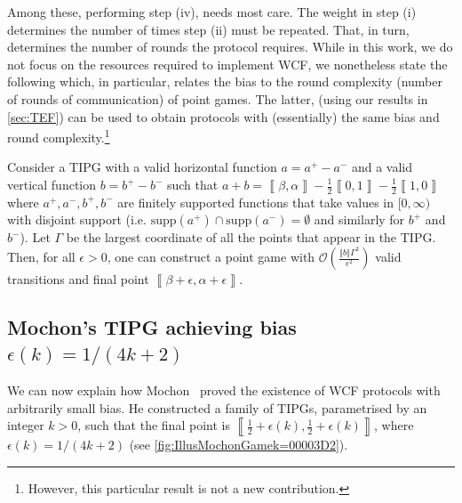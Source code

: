 \documentclass{theoretics}
\newcommand{\supp}{\text{supp}}
\begin{document}
Among these, performing step (iv), needs most care. The weight in step (i) determines the number of times step (ii) must be repeated. That, in turn, determines the number of rounds the protocol requires. While in this work, we do not focus on the resources required to implement WCF, we nonetheless state the following which, in particular, relates the bias to the round complexity (number of rounds of communication) of point games. The latter, (using our results in \cref{sec:TEF}) can be used to obtain protocols with (essentially) the same bias and round complexity.\footnote{However, this particular result is not a new contribution.}
%
%
%
%
%
%
%
%
%
%
%
%
%
%



%

\begin{corollary}
  Consider a TIPG with a valid horizontal function $a=a^{+}-a^{-}$
  and a valid vertical function $b=b^{+}-b^{-}$ such that $a+b=\left\llbracket \beta,\alpha\right\rrbracket -\frac{1}{2}\left\llbracket 0,1\right\rrbracket -\frac{1}{2}\left\llbracket 1,0\right\rrbracket $ where $a^+,a^-,b^+,b^-$ are finitely supported functions that take values in $[0,\infty)$ with disjoint support (i.e. $\supp(a^+)\cap \supp(a^-)=\emptyset$ and similarly for $b^+$ and $b^-$).
  Let $\Gamma$ be the largest coordinate of all the points that appear
  in the TIPG. Then, for all $\epsilon>0$, one can construct a point
  game with $\mathcal{O}\left(\frac{\left\Vert b\right\Vert \Gamma^{2}}{\epsilon^{2}}\right)$
  valid transitions and final point $\left\llbracket \beta+\epsilon,\alpha+\epsilon\right\rrbracket $.\label{cor:numberOfTransitionsForValidPointGames}
\end{corollary}

%

\subsection{Mochon's TIPG achieving bias \texorpdfstring{$\epsilon(k)=1/(4k+2)$}{epsilon(k)=1/(4k+2)}}\label{subsec:mochontipg}
We can now explain how Mochon~\cite{Mochon07} proved the existence of WCF protocols with arbitrarily small bias. He constructed a family of TIPGs, parametrised by an integer $k>0$, such that the final point is $\left\llbracket \frac{1}{2}+\epsilon(k),\frac{1}{2}+\epsilon(k)\right\rrbracket $, where $\epsilon(k)=1/(4k+2)$ (see  \cref{fig:IllusMochonGamek=00003D2}). %
\end{document}
